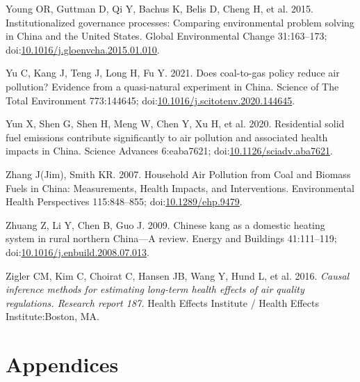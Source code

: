 \documentclass[
  letterpaper,
  DIV=11,
  numbers=noendperiod]{scrartcl}
\newlength{\cslhangindent}
\newlength{\cslentryspacingunit} %
\newenvironment{CSLReferences}[2] %
 {%
  \setlength{\parindent}{0pt}
  \ifodd #1
  \let\oldpar\par
  \def\par{\hangindent=\cslhangindent\oldpar}
  \fi
  \setlength{\parskip}{#2\cslentryspacingunit}
 }%
 {}
\begin{document}
\begin{CSLReferences}{1}{0}
\leavevmode{}%
Young OR, Guttman D, Qi Y, Bachus K, Belis D, Cheng H, et al. 2015.
Institutionalized governance processes: {Comparing} environmental
problem solving in {China} and the {United States}. Global Environmental
Change 31:163--173;
doi:\href{https://doi.org/10.1016/j.gloenvcha.2015.01.010}{10.1016/j.gloenvcha.2015.01.010}.

\leavevmode{}%
Yu C, Kang J, Teng J, Long H, Fu Y. 2021. Does coal-to-gas policy reduce
air pollution? {Evidence} from a quasi-natural experiment in {China}.
Science of The Total Environment 773:144645;
doi:\href{https://doi.org/10.1016/j.scitotenv.2020.144645}{10.1016/j.scitotenv.2020.144645}.

\leavevmode{}%
Yun X, Shen G, Shen H, Meng W, Chen Y, Xu H, et al. 2020. Residential
solid fuel emissions contribute significantly to air pollution and
associated health impacts in {China}. Science Advances 6:eaba7621;
doi:\href{https://doi.org/10.1126/sciadv.aba7621}{10.1126/sciadv.aba7621}.

\leavevmode{}%
Zhang J(Jim), Smith KR. 2007. Household {Air Pollution} from {Coal} and
{Biomass Fuels} in {China}: {Measurements}, {Health Impacts}, and
{Interventions}. Environmental Health Perspectives 115:848--855;
doi:\href{https://doi.org/10.1289/ehp.9479}{10.1289/ehp.9479}.

\leavevmode{}%
Zhuang Z, Li Y, Chen B, Guo J. 2009. Chinese kang as a domestic heating
system in rural northern {China}---{A} review. Energy and Buildings
41:111--119;
doi:\href{https://doi.org/10.1016/j.enbuild.2008.07.013}{10.1016/j.enbuild.2008.07.013}.

\leavevmode{}%
Zigler CM, Kim C, Choirat C, Hansen JB, Wang Y, Hund L, et al. 2016.
\emph{Causal inference methods for estimating long-term health effects
of air quality regulations. {Research} report 187.} Health Effects
Institute / Health Effects Institute:Boston, MA.

\end{CSLReferences}

\newpage
\appendix
\renewcommand{\thefigure}{A\arabic{figure}}
\renewcommand{\thetable}{A\arabic{table}}
\setcounter{figure}{0}
\setcounter{table}{0}

\hypertarget{appendices}{%
\section{Appendices}\label{appendices}}
\end{document}
